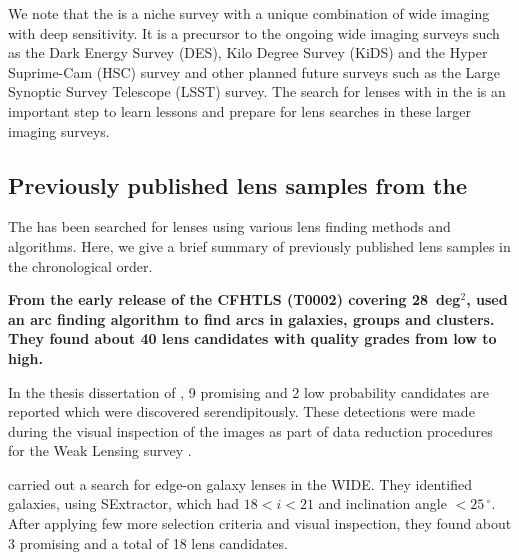 \documentclass[useAMS,usenatbib,a4paper]{mn2e}
\begin{document}
We note that the \cfhtls is a niche survey with a unique combination of wide
imaging with deep sensitivity. It is a precursor to the ongoing wide imaging
surveys such as the Dark Energy Survey (DES), Kilo Degree Survey (KiDS) and the
Hyper Suprime-Cam (HSC) survey and other planned future surveys such as the
Large Synoptic Survey Telescope (LSST) survey.  The search for lenses with \sw
in the \cfhtls is an important step to learn lessons and prepare for lens
searches in these larger imaging surveys.



\subsection{Previously published lens samples from the \cfhtls}
\label{sec:data:kls}

The \cfhtls has been searched for lenses using various lens finding
methods and algorithms. Here, we give a brief summary of previously published lens
samples in the chronological order.

{\bf From the early release of the CFHTLS (T0002) covering 28~deg$^2$,
\citet{Cabanac2007} used an arc finding algorithm \citep{Alard2006} to
find arcs in galaxies, groups and clusters. They found about 40 lens
candidates with quality grades from low to high.}

In the thesis dissertation of \citet{Thanjavur2009}, 9 promising and 2
low probability candidates are reported which were discovered
serendipitously. These detections were made during the visual
inspection of the \cfhtls images as part of data reduction procedures
for the Weak Lensing survey \citep{Benjamin2007}.

\citet{Sygnet2010} carried out a search for edge-on galaxy lenses in the
\cfhtls WIDE. They identified galaxies, using {\sc SExtractor}, which
had $18<i<21$ and inclination angle $<25\,^{\circ}$. After applying few more
selection criteria and visual inspection, they found about 3 promising
and a total of 18 lens candidates.
\end{document}
